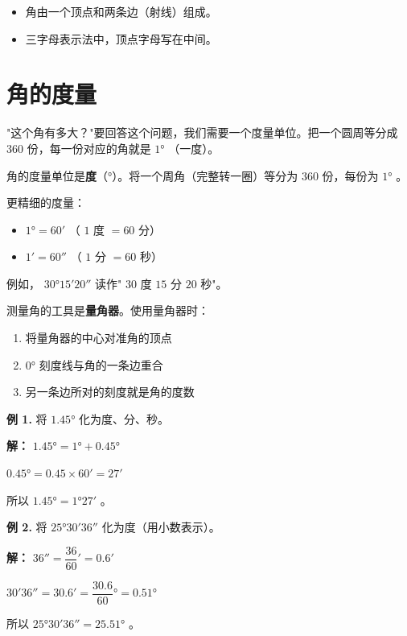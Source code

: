 \begin{keytakeaway}


\begin{itemize}
  \item 角由一个顶点和两条边（射线）组成。
  \item 三字母表示法中，顶点字母写在中间。
\end{itemize}


\end{keytakeaway}



\section*{角的度量}


\begin{explore}


"这个角有多大？"要回答这个问题，我们需要一个度量单位。把一个圆周等分成 $360$ 份，每一份对应的角就是 $1°$ （一度）。

\end{explore}

\begin{understand}


角的度量单位是\textbf{度}（°）。将一个周角（完整转一圈）等分为 $360$ 份，每份为 $1°$ 。

更精细的度量：
\begin{itemize}
  \item $1°= 60'$ （ $1$ 度 $= 60$ 分）
  \item $1' = 60''$ （ $1$ 分 $= 60$ 秒）
\end{itemize}


例如， $30°15'20''$ 读作" $30$ 度 $15$ 分 $20$ 秒"。

测量角的工具是\textbf{量角器}。使用量角器时：
\begin{enumerate}
  \item 将量角器的中心对准角的顶点
  \item $0°$ 刻度线与角的一条边重合
  \item 另一条边所对的刻度就是角的度数
\end{enumerate}


\end{understand}

\begin{workedexamples}


\textbf{例 1.} 将 $1.45°$ 化为度、分、秒。

\textbf{解：}
$1.45° = 1° + 0.45°$

$0.45° = 0.45 \times 60' = 27'$

所以 $1.45° = 1°27'$ 。

\textbf{例 2.} 将 $25°30'36''$ 化为度（用小数表示）。

\textbf{解：}
$36'' = \dfrac{36}{60}' = 0.6'$

$30'36'' = 30.6' = \dfrac{30.6}{60}° = 0.51°$

所以 $25°30'36'' = 25.51°$ 。

\end{workedexamples}

